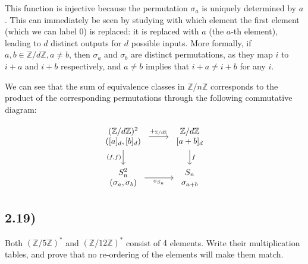 \documentclass[12pt, letterpaper, twoside]{report}
\begin{document}
This function is injective because the permutation $\sigma_a$ is uniquely determined by $a$. This can immediately be seen by studying with which element the first element (which we can label 0) is replaced: it is replaced with $a$ (the $a$-th element), leading to $d$ distinct outputs for $d$ possible inputs. More formally, if $a,b \in \mathbb{Z}/d\mathbb{Z}, a \neq b$, then $\sigma_a$ and $\sigma_b$ are distinct permutations, as they map $i$ to $i + a$ and $i + b$ respectively, and $a \neq b$ implies that $i + a \neq i + b$ for any $i$.

We can see that the sum of equivalence classes in $\mathbb{Z}/n\mathbb{Z}$ corresponds to the product of the corresponding permutations through the following commutative diagram:

$$
\begin{tikzcd}
	\begin{array}{c} (\mathbb{Z}/d\mathbb{Z})^2 \\ ([a]_d, [b]_d) \end{array} & \begin{array}{c} \mathbb{Z}/d\mathbb{Z} \\ {[a+b]_d} \end{array} \\
	\begin{array}{c} S_n^2 \\ (\sigma_a,\sigma_b) \end{array} & \begin{array}{c} S_n \\ \sigma_{a+b} \end{array}
	\arrow["{+_{\mathbb{Z}/d\mathbb{Z}}}", from=1-1, to=1-2]
	\arrow["{(f,f)}"', from=1-1, to=2-1]
	\arrow["f", from=1-2, to=2-2]
	\arrow["{\circ_{S_n}}"', from=2-1, to=2-2]
\end{tikzcd}
$$

\subsection*{2.19)}

Both $(\mathbb{Z}/5\mathbb{Z})^*$ and $(\mathbb{Z}/12\mathbb{Z})^*$ consist of $4$ elements. Write their multiplication tables, and prove that no re-ordering of the elements will make them match.
\end{document}
